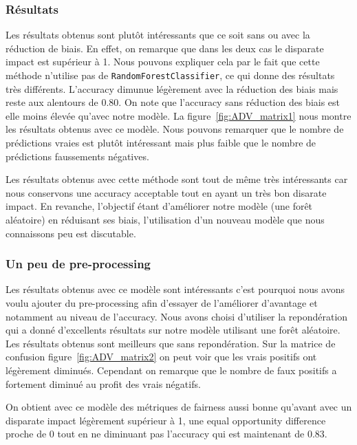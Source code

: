 \documentclass{article}
\begin{document}
    \subsubsection{Résultats}
    Les résultats obtenus sont plutôt intéressants que ce soit sans ou avec la réduction de biais. En effet, on remarque que 
    dans les deux cas le disparate impact est supérieur à 1. Nous pouvons expliquer cela par le fait 
    que cette méthode n'utilise pas de \texttt{RandomForestClassifier}, ce qui donne des résultats très différents. 
    L'accuracy dimunue légèrement avec la réduction des biais mais reste aux alentours de $0.80$. On note que l'accuracy 
    sans réduction des biais est elle moins élevée qu'avec notre modèle. La figure~\ref{fig:ADV_matrix1} nous montre les 
    résultats obtenus avec ce modèle. Nous pouvons remarquer que le nombre de prédictions vraies est plutôt 
    intéressant mais plus faible que le nombre de prédictions faussements négatives. 
    
    Les résultats obtenus avec cette méthode sont tout de même très intéressants car nous conservons une accuracy 
    acceptable tout en ayant un très bon disarate impact. En revanche, l'objectif étant d'améliorer notre modèle 
    (une forêt aléatoire) en réduisant ses biais, l'utilisation d'un nouveau modèle que nous connaissons peu 
    est discutable.

    \subsubsection{Un peu de pre-processing}
    Les résultats obtenus avec ce modèle sont intéressants c'est pourquoi nous avons voulu ajouter 
    du pre-processing afin d'essayer de l'améliorer d'avantage et notamment au niveau de l'accuracy.
    Nous avons choisi d'utiliser la repondération qui a donné d'excellents résultats sur notre 
    modèle utilisant une forêt aléatoire.
    Les résultats obtenus sont meilleurs que sans repondération. Sur la matrice de confusion 
    figure~\ref{fig:ADV_matrix2} on peut voir que les vrais positifs ont légèrement diminués. 
    Cependant on remarque que le nombre de faux positifs a fortement diminué au 
    profit des vrais négatifs. 
    
    On obtient avec ce modèle des métriques de fairness aussi bonne qu'avant avec un disparate impact 
    légèrement supérieur à 1, une equal opportunity difference proche de 0 tout en ne diminuant pas 
    l'accuracy qui est maintenant de $0.83$.
\end{document}
